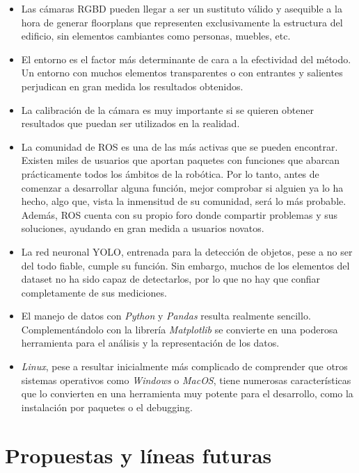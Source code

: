 \begin{itemize}

	\item Las cámaras RGBD pueden llegar a ser un sustituto válido y asequible a la hora de generar floorplans que representen exclusivamente la estructura del edificio, sin elementos cambiantes como personas, muebles, etc.
	\item El entorno es el factor más determinante de cara a la efectividad del método. Un entorno con muchos elementos transparentes o con entrantes y salientes perjudican en gran medida los resultados obtenidos.
	\item La calibración de la cámara es muy importante si se quieren obtener resultados que puedan ser utilizados en la realidad.
	\item La comunidad de ROS es una de las más activas que se pueden encontrar. Existen miles de usuarios que aportan paquetes con funciones que abarcan prácticamente todos los ámbitos de la robótica. Por lo tanto, antes de comenzar a desarrollar alguna función, mejor comprobar si alguien ya lo ha hecho, algo que, vista la inmensitud de su comunidad, será lo más probable. Además, ROS cuenta con su propio foro donde compartir problemas y sus soluciones, ayudando en gran medida a usuarios novatos.
	\item La red neuronal YOLO, entrenada para la detección de objetos, pese a no ser del todo fiable, cumple su función. Sin embargo, muchos de los elementos del dataset no ha sido capaz de detectarlos, por lo que no hay que confiar completamente de sus mediciones.
	\item El manejo de datos con \textit{Python} y \textit{Pandas}
 resulta realmente sencillo. Complementándolo con la librería \textit{Matplotlib} se convierte en una poderosa herramienta para el análisis y la representación de los datos.
 	\item \textit{Linux}, pese a resultar inicialmente más complicado de comprender que otros sistemas operativos como \textit{Windows} o \textit{MacOS}, tiene numerosas características que lo convierten en una herramienta muy potente para el desarrollo, como la instalación por paquetes o el debugging.

\end{itemize}

\section{Propuestas y líneas futuras}

